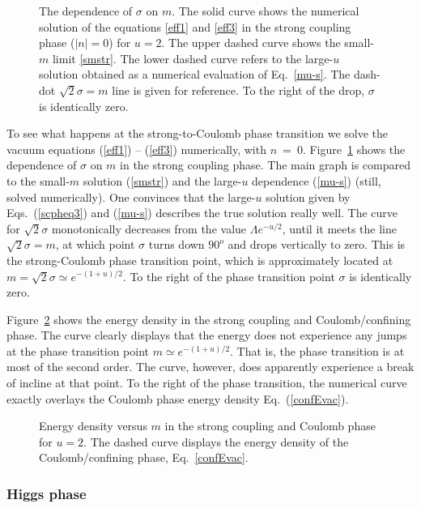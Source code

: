 \documentclass[epsfig,12pt]{article}
\begin{document}
{\begin{figure}
\epsfxsize=10cm
\centerline{}
\caption{\small The dependence of $\sigma$ on $m$. The solid curve shows the numerical solution
of the equations \eqref{eff1} and \eqref{eff3} in the strong coupling phase ($|n| = 0 $) for $u = 2$.
The upper dashed curve shows the small-$m$ limit \eqref{smstr}.
The lower dashed curve refers to the large-$u$ solution obtained as a numerical evaluation of
Eq.~\eqref{mu-s}.
The dash-dot $ \sqrt{2}\sigma = m $ line is given for reference.
To the right of the drop, $ \sigma $ is identically zero.}
\label{fig:numsigm}
\end{figure}
To see what happens at the strong-to-Coulomb phase transition we solve the vacuum equations 
(\ref{eff1}) -- (\ref{eff3}) numerically, with $ n ~=~ 0 $.
Figure~\ref{fig:numsigm} shows the dependence of $ \sigma $ on $ m $ in the strong
coupling phase. 
The main graph is compared to the small-$m$ solution (\ref{smstr}) and the large-$u$
dependence (\ref{mu-s}) (still, solved numerically). 
One convinces that the large-$u$ solution given by Eqs.~(\ref{scpheq3}) and (\ref{mu-s})
describes the true solution really well. 
The curve for $\sqrt{2}\sigma$ monotonically decreases from the value $\Lambda e^{-u/2}$, 
until it meets the line $ \sqrt{2}\sigma = m $,
at which point $ \sigma $ turns down $ 90^o $ and drops vertically to zero. 
This is the strong-Coulomb phase transition point, which is approximately located at
$ m = \sqrt{2}\sigma \simeq e^{-(1+u)/2} $.
To the right of the phase transition point $ \sigma $ is identically zero. 

Figure~\ref{fig:numEm} shows the energy density in the strong coupling and Coulomb/confining phase. 
The curve clearly displays that the energy does not experience any jumps at the phase transition 
point $ m \simeq e^{-(1+u)/2} $.
That is, the phase transition is at most of the second order.
The curve, however, does apparently experience a break of incline at that point. 
To the right of the phase transition, the numerical curve exactly overlays the Coulomb phase
energy density Eq.~(\ref{confEvac}).
\begin{figure}
\epsfxsize=10cm
\centerline{}
\caption{\small Energy density versus $m$ in the strong coupling and Coulomb phase for $u=2$. 
The dashed curve displays the energy density of the Coulomb/confining phase, Eq.~\eqref{confEvac}.}
\label{fig:numEm}
\end{figure}

\subsubsection{Higgs phase}
\label{subsnumhiggs}

}
\end{document}
